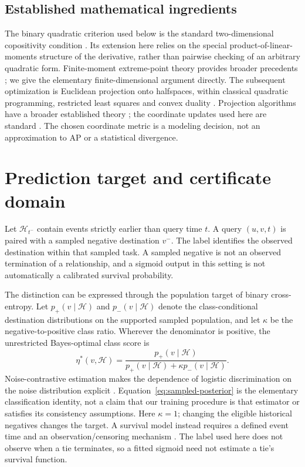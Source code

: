 \subsection{Established mathematical ingredients}
The binary quadratic criterion used below is the standard two-dimensional copositivity condition \cite{copositive}. Its extension here relies on the special product-of-linear-moments structure of the derivative, rather than pairwise checking of an arbitrary quadratic form. Finite-moment extreme-point theory provides broader precedents \cite{moment,pinelis}; we give the elementary finite-dimensional argument directly. The subsequent optimization is Euclidean projection onto halfspaces, within classical quadratic programming, restricted least squares and convex duality \cite{hildreth,dykstra,convex}. Projection algorithms have a broader established theory \cite{projection}; the coordinate updates used here are standard \cite{coordinate}. The chosen coordinate metric is a modeling decision, not an approximation to AP or a statistical divergence.

\section{Prediction target and certificate domain}\label{sec:domain}
Let $\mathcal H_{t^-}$ contain events strictly earlier than query time $t$. A query $(u,v,t)$ is paired with a sampled negative destination $v^-$. The label identifies the observed destination within that sampled task. A sampled negative is not an observed termination of a relationship, and a sigmoid output in this setting is not automatically a calibrated survival probability.

The distinction can be expressed through the population target of binary cross-entropy. Let $p_+(v\mid\mathcal H)$ and $p_-(v\mid\mathcal H)$ denote the class-conditional destination distributions on the supported sampled population, and let $\kappa$ be the negative-to-positive class ratio. Wherever the denominator is positive, the unrestricted Bayes-optimal class score is
\begin{equation}\label{eq:sampled-posterior}
\eta^*(v,\mathcal H)=
\frac{p_+(v\mid\mathcal H)}
{p_+(v\mid\mathcal H)+\kappa p_-(v\mid\mathcal H)}.
\end{equation}
Noise-contrastive estimation makes the dependence of logistic discrimination on the noise distribution explicit \cite{nce}. Equation~\eqref{eq:sampled-posterior} is the elementary classification identity, not a claim that our training procedure is that estimator or satisfies its consistency assumptions. Here $\kappa=1$; changing the eligible historical negatives changes the target. A survival model instead requires a defined event time and an observation/censoring mechanism \cite{aalen}. The label used here does not observe when a tie terminates, so a fitted sigmoid need not estimate a tie's survival function.

